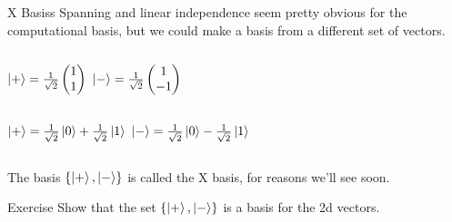 \documentclass{beamer}
\begin{document}
\begin{frame}{X Basis}s
    Spanning and linear independence seem pretty obvious for the computational basis, but we could make a basis from a different set of vectors.\vfill
    \begin{columns}
        \centering
        \begin{math}
            \ket{+} = \frac{1}{\sqrt{2}}\begin{pmatrix}
                1 \\ 1
            \end{pmatrix}
        \end{math}
        \centering
        \begin{math}
            \ket{-} = \frac{1}{\sqrt{2}}\begin{pmatrix}
                1 \\ -1
            \end{pmatrix}
        \end{math}
    \end{columns}\vfill
    \pause
    \begin{columns}
        \centering
        \begin{math}
            \ket{+} = \frac{1}{\sqrt{2}}\ket{0} + \frac{1}{\sqrt{2}}\ket{1}
        \end{math}
        \centering
        \begin{math}
            \ket{-} = \frac{1}{\sqrt{2}}\ket{0} - \frac{1}{\sqrt{2}}\ket{1}
        \end{math}
    \end{columns}\vfill
    \pause
    The basis $\{\ket{+}, \ket{-}\}$ is called the X basis, for reasons we'll see soon.\vfill
    \pause
    \begin{block}{Exercise}
        Show that the set $\{\ket{+}, \ket{-}\}$ is a basis for the 2d vectors.
    \end{block}
\end{frame}
\end{document}
